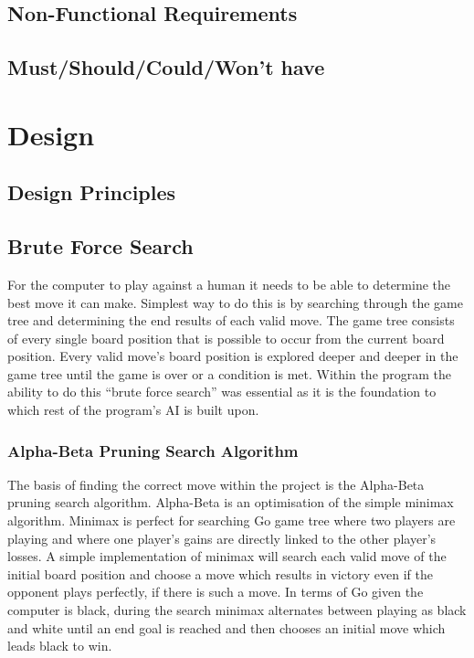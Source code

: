\documentclass{l4proj}
\begin{document}
\section{Non-Functional Requirements}

\section{Must/Should/Could/Won't have}




\chapter{Design}

\section{Design Principles}

\section{Brute Force Search}
For the computer to play against a human it needs to be able to determine the best move it can make. Simplest way to do this is by searching through the game tree and determining the end results of each valid move. The game tree consists of every single board position that is possible to occur from the current board position. Every valid move’s board position is explored deeper and deeper in the game tree until the game is over or a condition is met. Within the program the ability to do this “brute force search” was essential as it is the foundation to which rest of the program’s AI is built upon.

\subsection{Alpha-Beta Pruning Search Algorithm}

The basis of finding the correct move within the project is the Alpha-Beta pruning search algorithm. Alpha-Beta is an optimisation of the simple minimax algorithm. Minimax is perfect for searching Go game tree where two players are playing and where one player’s gains are directly linked to the other player’s losses. A simple implementation of minimax will search each valid move of the initial board position and choose a move which results in victory even if the opponent plays perfectly, if there is such a move. In terms of Go given the computer is black, during the search minimax alternates between playing as black and white until an end goal is reached and then chooses an initial move which leads black to win.
\end{document}
